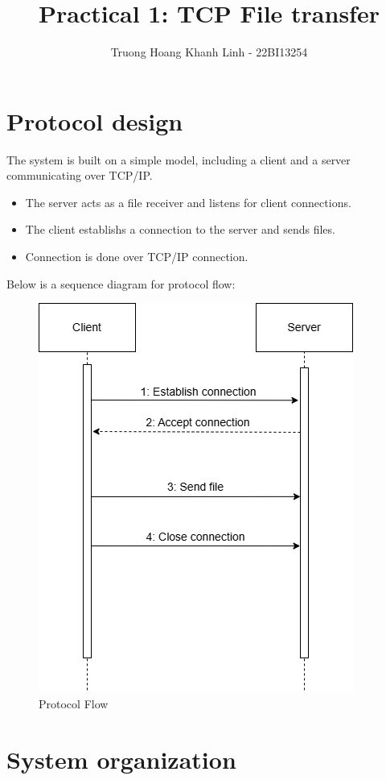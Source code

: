 \documentclass[12pt]{article}
\title{Practical 1: TCP File transfer}
\author{Truong Hoang Khanh Linh - 22BI13254}
\date{}
\begin{document}
\maketitle

\section{Protocol design}

The system is built on a simple model, including a client and a server communicating over TCP/IP.
\begin{itemize}
    \item The server acts as a file receiver and listens for client connections.
    \item The client establishs a connection to the server and sends files.
    \item Connection is done over TCP/IP connection.
\end{itemize}

Below is a sequence diagram for protocol flow:
\begin{figure}[!ht]
\centering
\includegraphics[scale=0.5]{protocol_design.png}
\caption{Protocol Flow}
\end{figure}


\section{System organization}
\end{document}
